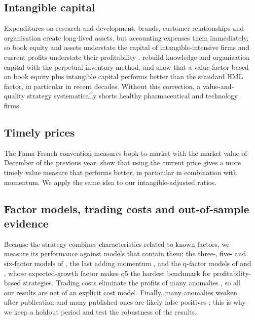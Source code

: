 \documentclass[12pt,a4paper]{article}
\begin{document}
\subsection{Intangible capital}

Expenditures on research and development, brands, customer relationships and organisation create
long-lived assets, but accounting expenses them immediately, so book equity and assets understate
the capital of intangible-intensive firms and current profits understate their profitability
\citep{LevSougiannis1996,ChanLakonishokSougiannis2001}. \citet{PetersTaylor2017} rebuild knowledge
and organisation capital with the perpetual inventory method, and
\citet{EisfeldtKimPapanikolaou2022} show that a value factor based on book equity plus intangible
capital performs better than the standard HML factor, in particular in recent decades. Without this
correction, a value-and-quality strategy systematically shorts healthy pharmaceutical and technology
firms.

\subsection{Timely prices}

The Fama-French convention measures book-to-market with the market value of December of the
previous year. \citet{AsnessFrazzini2013} show that using the current price gives a more timely
value measure that performs better, in particular in combination with momentum. We apply the same
idea to our intangible-adjusted ratios.

\subsection{Factor models, trading costs and out-of-sample evidence}

Because the strategy combines characteristics related to known factors, we measure its performance
against models that contain them: the three-, five- and six-factor models of
\citet{FamaFrench1993,FamaFrench2015,FamaFrench2018}, the last adding momentum
\citep{JegadeeshTitman1993,Carhart1997}, and the q-factor models of \citet{HouXueZhang2015} and
\citet{HouMoXueZhang2021}, whose expected-growth factor makes q5 the hardest benchmark for
profitability-based strategies. Trading costs eliminate the profits of many anomalies
\citep{NovyMarxVelikov2016}, so all our results are net of an explicit cost model. Finally, many
anomalies weaken after publication \citep{McLeanPontiff2016} and many published ones are likely false
positives \citep{HarveyLiuZhu2016}; this is why we keep a holdout period and test the robustness of
the results.
\end{document}
